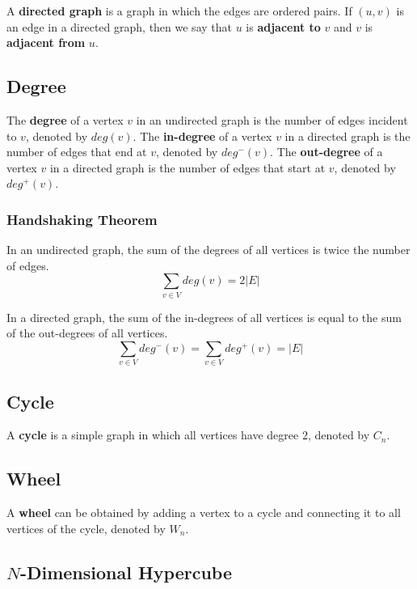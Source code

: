 \documentclass[a4paper,12pt]{article}
\begin{document}
A \textbf{directed graph} is a graph in which the edges are ordered pairs.
If $(u,v)$ is an edge in a directed graph, then we say that $u$ is \textbf{adjacent to} $v$ and $v$ is \textbf{adjacent from} $u$.

\subsection{Degree}

The \textbf{degree} of a vertex $v$ in an undirected graph is the number of edges incident to $v$, denoted by $deg(v)$.
The \textbf{in-degree} of a vertex $v$ in a directed graph is the number of edges that end at $v$, denoted by $deg^-(v)$.
The \textbf{out-degree} of a vertex $v$ in a directed graph is the number of edges that start at $v$, denoted by $deg^+(v)$.

\subsubsection{Handshaking Theorem}

In an undirected graph, the sum of the degrees of all vertices is twice the number of edges.
\begin{equation*}
	\sum_{v \in V} deg(v) = 2|E|
\end{equation*}

In a directed graph, the sum of the in-degrees of all vertices is equal to the sum of the out-degrees of all vertices.
\begin{equation*}
	\sum_{v \in V} deg^-(v) = \sum_{v \in V} deg^+(v) = |E|
\end{equation*}

\subsection{Cycle}

A \textbf{cycle} is a simple graph in which all vertices have degree 2, denoted by $C_n$.

\subsection{Wheel}

A \textbf{wheel} can be obtained by adding a vertex to a cycle and connecting it to all vertices of the cycle, denoted by $W_n$.

\subsection{$N$-Dimensional Hypercube}
\end{document}
